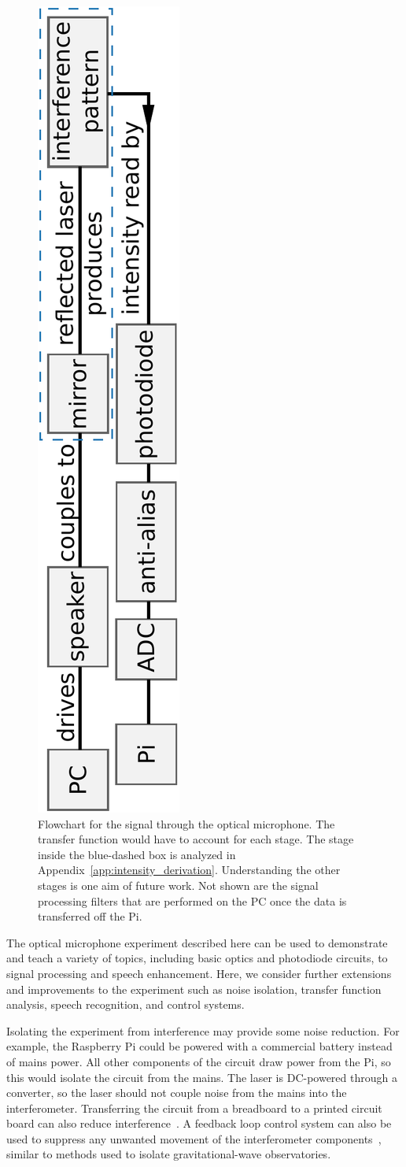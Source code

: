 \documentclass[paper-main.tex]{subfiles}
\begin{document}
\begin{figure}
	\includegraphics[height=.8\textwidth, angle=-90]{figures/pipeline.pdf}
	\caption{\label{fig:pipeline_highlighted}
Flowchart for the signal through the optical microphone. The transfer function would have to account for each stage. 
The stage inside the blue-dashed box is analyzed in Appendix~\ref{app:intensity_derivation}. Understanding the other stages is one aim of future work. Not shown are the signal processing filters that are performed on the PC once the data is transferred off the Pi.
}
\end{figure}

The optical microphone experiment described here can be used to demonstrate and teach a variety of topics, including basic optics and photodiode circuits, to signal processing and speech enhancement. 
Here, we consider further extensions and improvements to the experiment such as noise isolation, transfer function analysis, speech recognition, and control systems.


Isolating the experiment from interference may provide some noise reduction. 
For example, the Raspberry Pi could be powered with a commercial battery instead of mains power. 
All other components of the circuit draw power from the Pi, so this would isolate the circuit from the mains. 
The laser is DC-powered through a converter, so the laser should not couple noise from the mains into the interferometer. 
Transferring the circuit from a breadboard to a printed circuit board can also reduce interference~\cite{elfekey2013design}.
A feedback loop control system can also be used to suppress any unwanted movement of the interferometer components~\citep{abbott2017exploring, Sekiguchi:2016bmv, verhoeven2009robust}, similar to methods used to isolate gravitational-wave observatories. 
\end{document}
